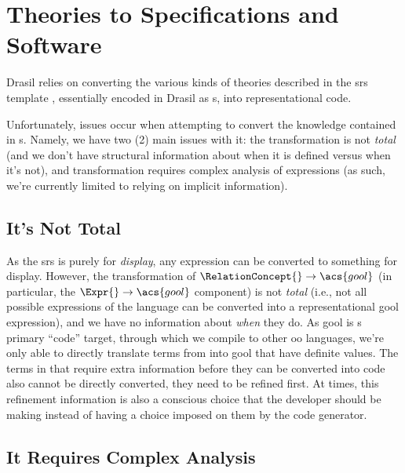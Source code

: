 \section{Theories to Specifications and Software}

Drasil relies on converting the various kinds of theories described in the
\acs{srs} template \cite{SmithAndLai2005}, essentially encoded in Drasil as
\RelationConcept{}s, into representational code.


Unfortunately, issues occur when attempting to convert the knowledge contained
in \RelationConcept{}s. Namely, we have two (2) main issues with it: the
transformation is not \textit{total} (and we don't have structural information
about when it is defined versus when it's not), and transformation requires
complex analysis of expressions (as such, we're currently limited to relying on
implicit information).

\subsection{It's Not Total}

As the \acs{srs} is purely for \textit{display}, any \Expr{} expression can be
converted to something for display. However, the transformation of
\(\RelationConcept{} \rightarrow \acs{gool}\) (in particular, the \(\Expr{}
\rightarrow \acs{gool}\) component) is not \textit{total} (i.e., not all
possible expressions of the \Expr{} language can be converted into a
representational \acs{gool} expression), and we have no information about
\textit{when} they do. As \acs{gool} is \Expr{}s primary ``code'' target,
through which we compile to other \acs{oo} languages, we're only able to
directly translate terms from \Expr{} into \acs{gool} that have definite values.
The terms in \Expr{} that require extra information before they can be converted
into code also cannot be directly converted, they need to be refined first. At
times, this refinement information is also a conscious choice that the developer
should be making instead of having a choice imposed on them by the code
generator.

\subsection{It Requires Complex Analysis}


